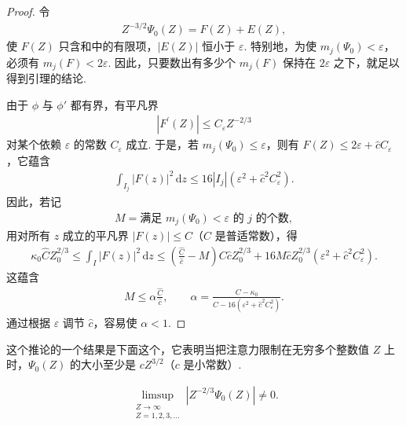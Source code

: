 \begin{proof}
令
\begin{align*}
  Z^{-3/2}\Psi_{0}(Z)=F(Z)+E(Z),
\end{align*}
使 $F(Z)$ 只含和中的有限项，$|E(Z)|$ 恒小于 $\varepsilon$. 特别地，为使 $m_j(\Psi_0) < \varepsilon$，必须有 $m_j(F) < 2\varepsilon$. 因此，只要数出有多少个 $m_j(F)$ 保持在 $2\varepsilon$ 之下，就足以得到引理的结论.

由于 $\phi$ 与 $\phi'$ 都有界，有平凡界
\begin{align*}
  |F^{\prime}(Z)|\leq C_{\varepsilon}Z^{-2/3}
\end{align*}
对某个依赖 $\varepsilon$ 的常数 $C_\varepsilon$ 成立. 于是，若 $m_j(\Psi_0) \leq \varepsilon$，则有 $F(Z) \leq 2\varepsilon + \hat{c}C_\varepsilon$，它蕴含
\begin{align*}
  \int_{I_{j}}\left|F(z)\right|^{2}\,\mathrm{d}z
  \leq 16\left|I_{j}\right|\left(\varepsilon^{2}+\hat{c}^{2}C_{\varepsilon}^{2}\right).
\end{align*}
因此，若记
\begin{align*}
  M=\text{满足 } m_{j}(\Psi_{0})<\varepsilon \text{ 的 } j \text{ 的个数},
\end{align*}
用对所有 $z$ 成立的平凡界 $|F(z)| \leq C$（$C$ 是普适常数），得
\begin{align*}
  \kappa_{0}\hat{C}Z_{0}^{2/3}
  \leq\int_{I}|F(z)|^{2}\,\mathrm{d}z
  \leq\left(\frac{\hat{C}}{\hat{c}}-M\right)C\hat{c}Z_{0}^{2/3}
  +16M\hat{c}Z_{0}^{2/3}\left(\varepsilon^{2}+\hat{c}^{2}C_{\varepsilon}^{2}\right).
\end{align*}
这蕴含
\begin{align*}
  M\leq\alpha\frac{\hat{C}}{\hat{c}},
  \qquad
  \alpha=\frac{C-\kappa_{0}}{C-16(\varepsilon^{2}+\hat{c}^{2}C_{\varepsilon}^{2})}.
\end{align*}
通过根据 $\varepsilon$ 调节 $\hat{c}$，容易使 $\alpha < 1$.
\end{proof}

这个推论的一个结果是下面这个，它表明当把注意力限制在无穷多个整数值 $Z$ 上时，$\Psi_0(Z)$ 的大小至少是 $cZ^{3/2}$（$c$ 是小常数）.

\begin{corollary}\label{cor:9.25}
\begin{align*}
  \limsup_{\substack{Z\to\infty\\ Z=1,2,3,\ldots}}|Z^{-2/3}\Psi_{0}(Z)|\neq 0.
\end{align*}
\end{corollary}


